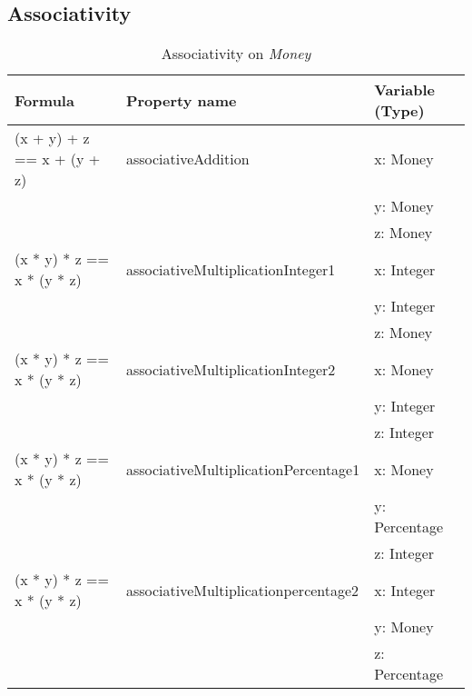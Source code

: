 \subsection{Associativity}
\label{ssct:4_associativity}
\begin{table}[h!]
\centering
\begin{tabular}{|lll|}
\hline
                        \textbf{Formula}           & \textbf{Property name}               & \textbf{Variable (Type)} \\ \hline
\rowcolor[HTML]{EFEFEF} (x + y) + z == x + (y + z) & associativeAddition                  & x: Money                 \\
\rowcolor[HTML]{EFEFEF}                            &                                      & y: Money                 \\
\rowcolor[HTML]{EFEFEF}                            &                                      & z: Money                 \\
                        (x * y) * z == x * (y * z) & associativeMultiplicationInteger1    & x: Integer               \\
                                                   &                                      & y: Integer               \\
                                                   &                                      & z: Money                 \\
\rowcolor[HTML]{EFEFEF} (x * y) * z == x * (y * z) & associativeMultiplicationInteger2    & x: Money                 \\
\rowcolor[HTML]{EFEFEF}                            &                                      & y: Integer               \\
\rowcolor[HTML]{EFEFEF}                            &                                      & z: Integer               \\
                        (x * y) * z == x * (y * z) & associativeMultiplicationPercentage1 & x: Money                 \\
                                                   &                                      & y: Percentage            \\
                                                   &                                      & z: Integer               \\
\rowcolor[HTML]{EFEFEF} (x * y) * z == x * (y * z) & associativeMultiplicationpercentage2 & x: Integer               \\
\rowcolor[HTML]{EFEFEF}                            &                                      & y: Money                 \\
\rowcolor[HTML]{EFEFEF}                            &                                      & z: Percentage            \\ \hline
\end{tabular}
\caption{Associativity on \textit{Money}}
\label{tbl:ch4_money_associativity}
\end{table}

